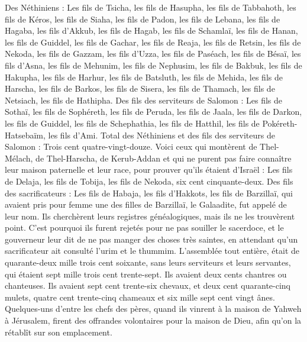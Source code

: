 \begin{multicols}{2}
Des Néthiniens : Les fils de Tsicha, les fils de Hasupha, les fils de Tabbahoth,
les fils de Kéros, les fils de Siaha, les fils de Padon,
les fils de Lebana, les fils de Hagaba, les fils d'Akkub,
les fils de Hagab, les fils de Schamlaï, les fils de Hanan,
les fils de Guiddel, les fils de Gachar, les fils de Reaja,
les fils de Retsin, les fils de Nekoda, les fils de Gazzam,
les fils d'Uzza, les fils de Paséach, les fils de Bésaï,
les fils d'Asna, les fils de Mehunim, les fils de Nephusim,
les fils de Bakbuk, les fils de Hakupha, les fils de Harhur,
les fils de Batsluth, les fils de Mehida, les fils de Harscha,
les fils de Barkos, les fils de Sisera, les fils de Thamach,
les fils de Netsiach, les fils de Hathipha.
Des fils des serviteurs de Salomon : Les fils de Sothaï, les fils de Sophéreth, les fils de Peruda,
les fils de Jaala, les fils de Darkon, les fils de Guiddel,
les fils de Schephathia, les fils de Hatthil, les fils de Pokéreth-Hatsebaïm, les fils d'Ami.
Total des Néthiniens et des fils des serviteurs de Salomon : Trois cent quatre-vingt-douze.
Voici ceux qui montèrent de Thel-Mélach, de Thel-Harscha, de Kerub-Addan et qui ne purent pas faire connaître leur maison paternelle et leur race, pour prouver qu'ils étaient d'Israël :
Les fils de Delaja, les fils de Tobija, les fils de Nekoda, six cent cinquante-deux.
Des fils des sacrificateurs : Les fils de Habaja, les fils d'Hakkots, les fils de Barzillaï, qui avaient pris pour femme une des filles de Barzillaï, le Galaadite, fut appelé de leur nom.
Ils cherchèrent leurs registres généalogiques, mais ils ne les trouvèrent point. C'est pourquoi ils furent rejetés pour ne pas souiller le sacerdoce,
et le gouverneur leur dit de ne pas manger des choses très saintes, en attendant qu'un sacrificateur ait consulté l'urim et le thummim.
L'assemblée tout entière, était de quarante-deux mille trois cent soixante,
sans leurs serviteurs et leurs servantes, qui étaient sept mille trois cent trente-sept. Ils avaient deux cents chantres ou chanteuses.
Ils avaient sept cent trente-six chevaux, et deux cent quarante-cinq mulets,
quatre cent trente-cinq chameaux et six mille sept cent vingt ânes.
Quelques-uns d'entre les chefs des pères, quand ils vinrent à la maison de Yahweh à Jérusalem, firent des offrandes volontaires pour la maison de Dieu, afin qu'on la rétablît sur son emplacement.

\end{multicols}
